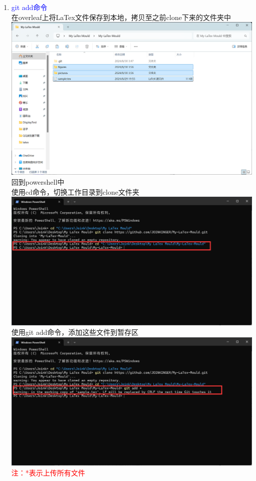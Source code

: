 \documentclass[12pt,a4paper,UTF8]{article}
\begin{document}
\begin{enumerate}
        \item \textcolor{blue}{git add命令}\\
        在overleaf上将LaTex文件保存到本地，拷贝至之前clone下来的文件夹中\\[6pt]
        \includegraphics[scale=0.25]{pictures/git/17.png}\\
        回到powershell中\\
        使用cd命令，切换工作目录到clone文件夹\\[6pt]
        \includegraphics[scale=0.25]{pictures/git/17_2.png}\\
        使用git add命令，添加这些文件到暂存区\\[6pt]
        \includegraphics[scale=0.25]{pictures/git/17_3.png}\\
        \textcolor{red}{注：*表示上传所有文件}
        

\end{enumerate}
\end{document}
